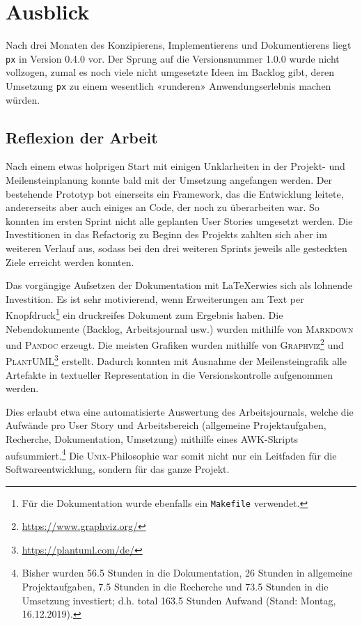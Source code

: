 \section{Ausblick}

Nach drei Monaten des Konzipierens, Implementierens und Dokumentierens liegt \texttt{px} in Version 0.4.0 vor. Der Sprung auf die Versionsnummer 1.0.0 wurde nicht vollzogen, zumal es noch viele nicht umgesetzte Ideen im Backlog gibt, deren Umsetzung \texttt{px} zu einem wesentlich «runderen» Anwendungserlebnis machen würden.

\subsection{Reflexion der Arbeit}

Nach einem etwas holprigen Start mit einigen Unklarheiten in der Projekt- und Meilensteinplanung konnte bald mit der Umsetzung angefangen werden. Der bestehende Prototyp bot einerseits ein Framework, das die Entwicklung leitete, andererseits aber auch einiges an Code, der noch zu überarbeiten war. So konnten im ersten Sprint nicht alle geplanten User Stories umgesetzt werden. Die Investitionen in das Refactorig zu Beginn des Projekts zahlten sich aber im weiteren Verlauf aus, sodass bei den drei weiteren Sprints jeweils alle gesteckten Ziele erreicht werden konnten.

Das vorgängige Aufsetzen der Dokumentation mit \LaTeX erwies sich als lohnende Investition. Es ist sehr motivierend, wenn Erweiterungen am Text per Knopfdruck\footnote{Für die Dokumentation wurde ebenfalls ein \texttt{Makefile} verwendet.} ein druckreifes Dokument zum Ergebnis haben. Die Nebendokumente (Backlog, Arbeitsjournal usw.) wurden mithilfe von \textsc{Markdown} und \textsc{Pandoc} erzeugt. Die meisten Grafiken wurden mithilfe von \textsc{Graphviz}\footnote{\url{https://www.graphviz.org/}} und \textsc{PlantUML}\footnote{\url{https://plantuml.com/de/}} erstellt. Dadurch konnten mit Ausnahme der Meilensteingrafik alle Artefakte in textueller Representation in die Versionskontrolle aufgenommen werden.

Dies erlaubt etwa eine automatisierte Auswertung des Arbeitsjournals, welche die Aufwände pro User Story und Arbeitsbereich (allgemeine Projektaufgaben, Recherche, Dokumentation, Umsetzung) mithilfe eines \textsc{AWK}-Skripts aufsummiert.\footnote{Bisher wurden 56.5 Stunden in die Dokumentation, 26 Stunden in allgemeine Projektaufgaben, 7.5 Stunden in die Recherche und 73.5 Stunden in die Umsetzung investiert; d.h. total 163.5 Stunden Aufwand (Stand: Montag, 16.12.2019).} Die \textsc{Unix}-Philoso\-phie war somit nicht nur ein Leitfaden für die Softwareentwicklung, sondern für das ganze Projekt.

